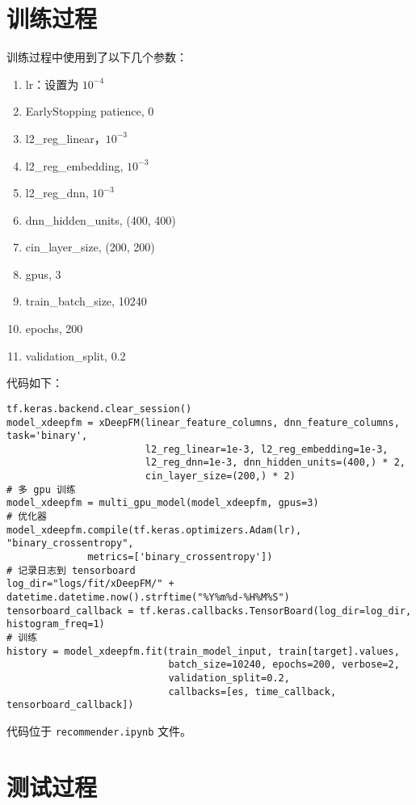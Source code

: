 \documentclass[degree=project,degree-type=project,cjk-font=noto]{thuthesis}
\begin{document}
\section{训练过程}
训练过程中使用到了以下几个参数：

\begin{enumerate}
  \item lr：设置为 $10^{-4}$
  \item EarlyStopping patience, 0
  \item l2\_reg\_linear，$10^{-3}$
  \item l2\_reg\_embedding, $10^{-3}$
  \item l2\_reg\_dnn, $10^{-3}$
  \item dnn\_hidden\_units, (400, 400)
  \item cin\_layer\_size, (200, 200)
  \item gpus, 3
  \item train\_batch\_size, 10240
  \item epochs, 200
  \item validation\_split, 0.2
\end{enumerate}

代码如下：

  \begin{verbatim}
tf.keras.backend.clear_session()
model_xdeepfm = xDeepFM(linear_feature_columns, dnn_feature_columns, task='binary',
                        l2_reg_linear=1e-3, l2_reg_embedding=1e-3,
                        l2_reg_dnn=1e-3, dnn_hidden_units=(400,) * 2,
                        cin_layer_size=(200,) * 2)
# 多 gpu 训练
model_xdeepfm = multi_gpu_model(model_xdeepfm, gpus=3)
# 优化器
model_xdeepfm.compile(tf.keras.optimizers.Adam(lr), "binary_crossentropy",
              metrics=['binary_crossentropy'])
# 记录日志到 tensorboard
log_dir="logs/fit/xDeepFM/" + datetime.datetime.now().strftime("%Y%m%d-%H%M%S")
tensorboard_callback = tf.keras.callbacks.TensorBoard(log_dir=log_dir, histogram_freq=1)
# 训练
history = model_xdeepfm.fit(train_model_input, train[target].values,
                            batch_size=10240, epochs=200, verbose=2,
                            validation_split=0.2,
                            callbacks=[es, time_callback, tensorboard_callback])
  \end{verbatim}


代码位于 \texttt{recommender.ipynb} 文件。

\section{测试过程}
\end{document}

